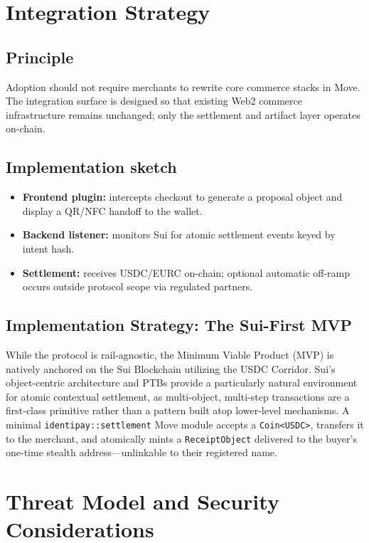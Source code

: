 \documentclass[11pt]{article}
\begin{document}
\section{Integration Strategy}
\subsection{Principle}
Adoption should not require merchants to rewrite core commerce stacks in Move. The integration surface is designed so that existing Web2 commerce infrastructure remains unchanged; only the settlement and artifact layer operates on-chain.

\subsection{Implementation sketch}
\begin{itemize}
  \item \textbf{Frontend plugin:} intercepts checkout to generate a proposal object and display a QR/NFC handoff to the wallet.
  \item \textbf{Backend listener:} monitors Sui for atomic settlement events keyed by intent hash.
  \item \textbf{Settlement:} receives USDC/EURC on-chain; optional automatic off-ramp occurs outside protocol scope via regulated partners.
\end{itemize}

\subsection{Implementation Strategy: The Sui-First MVP}
While the protocol is rail-agnostic, the Minimum Viable Product (MVP) is natively anchored on the Sui Blockchain utilizing the USDC Corridor. Sui's object-centric architecture and PTBs provide a particularly natural environment for atomic contextual settlement, as multi-object, multi-step transactions are a first-class primitive rather than a pattern built atop lower-level mechanisms. A minimal \texttt{identipay::settlement} Move module accepts a \texttt{Coin<USDC>}, transfers it to the merchant, and atomically mints a \texttt{ReceiptObject} delivered to the buyer's one-time stealth address---unlinkable to their registered name.


\section{Threat Model and Security Considerations}
\end{document}
